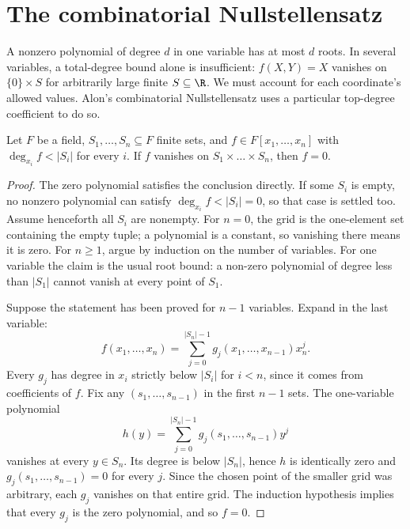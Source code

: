 \section{The combinatorial Nullstellensatz}

A nonzero polynomial of degree $d$ in one variable has at most $d$ roots.
In several variables, a total-degree bound alone is insufficient: $f(X,Y)=X$
vanishes on $\{0\}\times S$ for arbitrarily large finite $S\subseteq\R$.
We must account for each coordinate's allowed values. Alon's combinatorial
Nullstellensatz uses a particular top-degree coefficient to do so.

\begin{lemma}\label{combinatorial:lem:grid}
Let $F$ be a field, $S_1,\dots,S_n\subseteq F$ finite sets, and
$f\in F[x_1,\dots,x_n]$ with $\deg_{x_i}f<|S_i|$ for every $i$.
If $f$ vanishes on $S_1\times\dots\times S_n$, then $f=0$.
\end{lemma}
\begin{proof}
The zero polynomial satisfies the conclusion directly. If some $S_i$ is
empty, no nonzero polynomial can satisfy $\deg_{x_i}f<|S_i|=0$, so that case
is settled too. Assume henceforth all $S_i$ are nonempty.
For $n=0$, the grid is the one-element set containing the empty tuple;
a polynomial is a constant, so vanishing there means it is zero.
For $n\ge1$, argue by induction on the number of variables.
For one variable the claim is the usual root bound:
a non-zero polynomial of degree less than $|S_1|$
cannot vanish at every point of $S_1$.

Suppose the statement has been proved for $n-1$
variables. Expand in the last variable:
\[
f(x_1,\ldots,x_n)
=\sum_{j=0}^{|S_n|-1}
g_j(x_1,\ldots,x_{n-1})x_n^j.
\]
Every $g_j$ has degree in $x_i$ strictly below
$|S_i|$ for $i<n$, since it comes from coefficients
of $f$. Fix any $(s_1,\ldots,s_{n-1})$ in the
first $n-1$ sets. The one-variable polynomial
\[
h(y)=\sum_{j=0}^{|S_n|-1}
g_j(s_1,\ldots,s_{n-1})y^j
\]
vanishes at every $y\in S_n$. Its degree is below
$|S_n|$, hence $h$ is identically zero and
$g_j(s_1,\ldots,s_{n-1})=0$ for every $j$.
Since the chosen point of the smaller grid was
arbitrary, each $g_j$ vanishes on that entire grid.
The induction hypothesis implies that every $g_j$
is the zero polynomial, and so $f=0$.
\end{proof}

